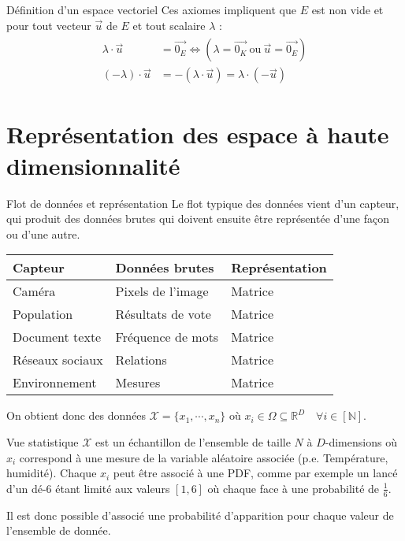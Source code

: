 \documentclass[a4paper]{article}
\begin{document}
\begin{parag}{Définition d'un espace vectoriel}
		Ces axiomes impliquent que $E$ est non vide et pour tout vecteur $\vec{u}$ de $E$ et tout scalaire $\lambda$ :
		\begin{align}
		\begin{split}
			\lambda \cdot \vec{u} &= \vec{0_E} \Leftrightarrow (\lambda = \vec{0_K}\ \text{ou}\ \vec{u} = \vec{0_E}) \\
			(-\lambda) \cdot \vec{u} &= -(\lambda \cdot \vec{u}) = \lambda \cdot (-\vec{u})
		\end{split}
		\end{align}
	\end{parag}

	\section{Représentation des espace à haute dimensionnalité}
	\begin{parag}{Flot de données et représentation}
		Le flot typique des données vient d'un capteur, qui produit des données brutes qui doivent ensuite être représentée d'une façon ou d'une autre.

		
		\begin{center}
		\begin{tabular}{ | l | l | l | }
			\hline
			\textbf{Capteur} & \textbf{Données brutes} & \textbf{Représentation} \\
			\hline \hline
			Caméra & Pixels de l'image & Matrice \\
			Population & Résultats de vote & Matrice \\
			Document texte & Fréquence de mots & Matrice \\
			Réseaux sociaux & Relations & Matrice \\
			Environnement & Mesures & Matrice \\
			\hline
		\end{tabular}
		\end{center}

		On obtient donc des données $\mathcal{X} = \{x_1, \cdots, x_n\}$ où $x_i \in \Omega \subseteq \mathbb{R}^D \quad \forall i \in [\mathbb{N}]$.
	\end{parag}

	\begin{parag}{Vue statistique}
		$\mathcal{X}$ est un échantillon de l'ensemble de taille $N$ à $D$-dimensions où $x_i$ correspond à une mesure de la variable aléatoire associée (p.e. Température, humidité). Chaque $x_i$ peut être associé à une PDF, comme par exemple un lancé d'un dé-6 étant limité aux valeurs $[1, 6]$ où chaque face à une probabilité de $\frac{1}{6}$.

		Il est donc possible d'associé une probabilité d'apparition pour chaque valeur de l'ensemble de donnée.
	\end{parag}
	
\end{document}

